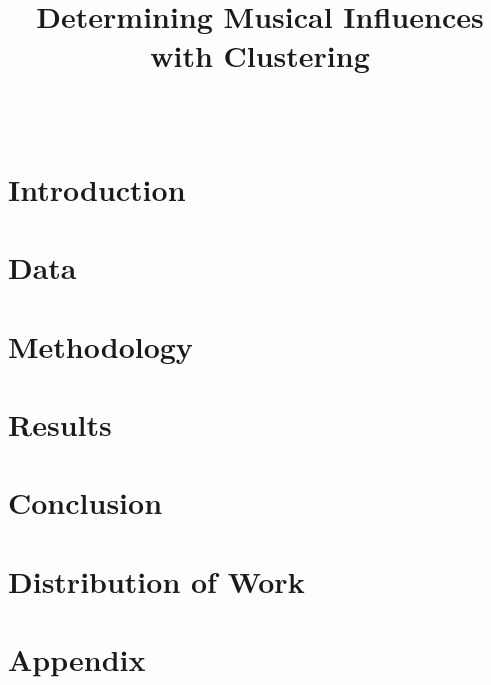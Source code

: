 \documentclass[12pt]{article}
\title{Determining Musical Influences with Clustering}
\author{\names \\
        \class }
\begin{document}
    \begingroup
        \let\newpage\relax%
        \maketitle
    \endgroup

    \section{Introduction}
        
    \section{Data}
        
    \section{Methodology}
        
    \section{Results}
        
    \section{Conclusion}
        

    \newpage
    \section{Distribution of Work}
        
    \section{Appendix}
        
   
\end{document}
